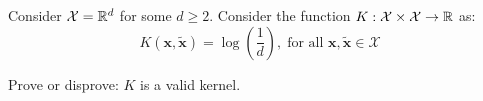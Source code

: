 Consider ${\cal X}=\mathbb{R}^d$ for some $d \geq 2$. Consider the function $K: {\cal X} \times {\cal X} \rightarrow \mathbb{R}$ as:
$$K(\mathbf{x},\tilde{\mathbf{x}}) = \log \left(\frac{1}{d}\right), \; \text{for all }  \mathbf{x},\tilde{\mathbf{x}} \in \mathcal{X}$$ 

Prove or disprove: $K$ is a valid kernel.
